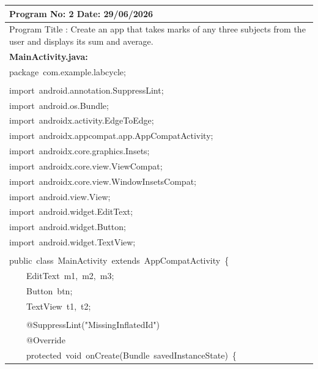 \documentclass[a4paper,12pt]{article}
\begin{document}
\newpage

\noindent\begingroup
\renewcommand{\arraystretch}{1.1}
\begin{longtable}{|p{}|}
\hline\endfirsthead\hline\endhead\hline\endfoot\hline\endlastfoot
\rule{0pt}{13pt}Program No: 2 \hfill Date: 29/06/2026 \\
\hline
\rule{0pt}{13pt}Program Title : Create an app that takes marks of any three subjects from the user and displays its sum and average. \\
\hline
\rule{0pt}{13pt}\textbf{MainActivity.java:} \\
\hline
{\ttfamily\small package\ com.example.labcycle;} \\
\strut \\
{\ttfamily\small import\ android.annotation.SuppressLint;} \\
{\ttfamily\small import\ android.os.Bundle;} \\
{\ttfamily\small import\ androidx.activity.EdgeToEdge;} \\
{\ttfamily\small import\ androidx.appcompat.app.AppCompatActivity;} \\
{\ttfamily\small import\ androidx.core.graphics.Insets;} \\
{\ttfamily\small import\ androidx.core.view.ViewCompat;} \\
{\ttfamily\small import\ androidx.core.view.WindowInsetsCompat;} \\
{\ttfamily\small import\ android.view.View;} \\
{\ttfamily\small import\ android.widget.EditText;} \\
{\ttfamily\small import\ android.widget.Button;} \\
{\ttfamily\small import\ android.widget.TextView;} \\
\strut \\
{\ttfamily\small public\ class\ MainActivity\ extends\ AppCompatActivity\ \{} \\
{\ttfamily\small \ \ \ \ EditText\ m1,\ m2,\ m3;} \\
{\ttfamily\small \ \ \ \ Button\ btn;} \\
{\ttfamily\small \ \ \ \ TextView\ t1,\ t2;} \\
\strut \\
{\ttfamily\small \ \ \ \ @SuppressLint("MissingInflatedId")} \\
{\ttfamily\small \ \ \ \ @Override} \\
{\ttfamily\small \ \ \ \ protected\ void\ onCreate(Bundle\ savedInstanceState)\ \{} \\

\end{longtable}
\end{document}
